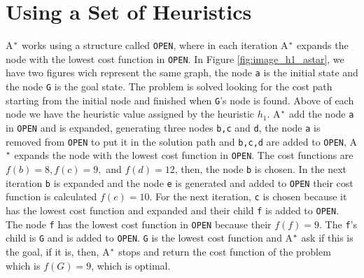 \section{Using a Set of Heuristics}
A$\sp{*}$ works using a structure called \texttt{OPEN}, where in each iteration A$\sp{*}$ expands the node with the lowest cost function in \texttt{OPEN}. In Figure \ref{fig:image_h1_astar}, we have two figures wich represent the same graph, the node \texttt{a} is the initial state and the node \texttt{G} is the goal state. The problem is solved looking for the cost path starting from the initial node and finished when \texttt{G}'s node is found. Above of each node we have the heuristic value assigned by the heuristic $h_{1}$. A$\sp{*}$ add the node \texttt{a} in \texttt{OPEN} and is expanded, generating three nodes \texttt{b,c} and \texttt{d}, the node \texttt{a} is removed from \texttt{OPEN} to put it in the solution path and \texttt{b,c,d} are added to \texttt{OPEN}, A$\sp{*}$ expands the node with the lowest cost function in \texttt{OPEN}. The cost functions are $f(b)=8, f(c)=9,$ and $ f(d)=12$, then, the node \texttt{b} is chosen. In the next iteration \texttt{b} is expanded and the node \texttt{e} is generated and added to \texttt{OPEN} their cost function is calculated $f(e)=10$. For the next iteration, \texttt{c} is chosen because it has the lowest cost function and expanded and their child \texttt{f} is added to \texttt{OPEN}. The node \texttt{f} has the lowest cost function in \texttt{OPEN} because their $f(f)=9$. The \texttt{f}'s child is \texttt{G} and is added to \texttt{OPEN}. \texttt{G} is the lowest cost function and A$\sp{*}$ ask if this is the goal, if it is, then, A$\sp{*}$ stops and return the cost function of the problem which is $f(G)=9$, which is optimal.  


